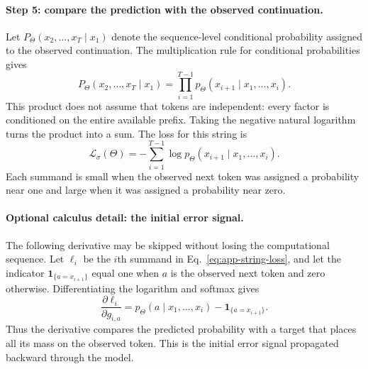 \documentclass[
  aps,
  reprint,
  superscriptaddress,
  floatfix,
  nofootinbib,
  longbibliography
]{revtex4-2}
\begin{document}
\paragraph{Step 5: compare the prediction with the observed continuation.}
Let $P_\Theta(x_2,\ldots,x_T\mid x_1)$ denote the sequence-level conditional
probability assigned to the observed continuation.  The multiplication rule for
conditional probabilities gives
\begin{equation}
\label{eq:app-sequence-probability}
P_\Theta(x_2,\ldots,x_T\mid x_1)
=\prod_{i=1}^{T-1}
p_\Theta(x_{i+1}\mid x_1,\ldots,x_i).
\end{equation}
This product does not assume that tokens are independent: every factor is
conditioned on the entire available prefix.  Taking the negative natural
logarithm turns the product into a sum.  The loss for this string is
\begin{equation}
\label{eq:app-string-loss}
\mathcal L_\sigma(\Theta)
=-\sum_{i=1}^{T-1}
\log p_\Theta(x_{i+1}\mid x_1,\ldots,x_i).
\end{equation}
Each summand is small when the observed next token was assigned a probability
near one and large when it was assigned a probability near zero.

\paragraph{Optional calculus detail: the initial error signal.}
The following derivative may be skipped without losing the computational
sequence.  Let
$\ell_i$ be the $i$th summand in Eq.~\eqref{eq:app-string-loss}, and let the
indicator $\mathbf 1_{\{a=x_{i+1}\}}$ equal one when $a$ is the observed next
token and zero otherwise.  Differentiating the logarithm and softmax gives
\begin{equation}
\label{eq:app-softmax-derivative}
\frac{\partial\ell_i}{\partial g_{i,a}}
=p_\Theta(a\mid x_1,\ldots,x_i)
-\mathbf 1_{\{a=x_{i+1}\}}.
\end{equation}
Thus the derivative compares the predicted probability with a target that
places all its mass on the observed token.  This is the initial error signal
propagated backward through the model.
\end{document}

